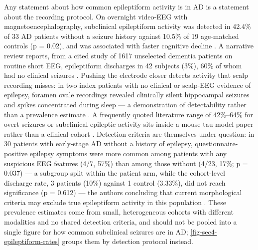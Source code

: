 \documentclass[11pt]{article}
\begin{document}
Any statement about how common epileptiform activity is in AD is a statement about the recording protocol. On overnight video-EEG with magnetoencephalography, subclinical epileptiform activity was detected in 42.4\% of 33 AD patients without a seizure history against 10.5\% of 19 age-matched controls (p = 0.02), and was associated with faster cognitive decline \citep{Vossel2016}. A narrative review reports, from a cited study of 1617 unselected dementia patients on routine short EEG, epileptiform discharges in 42 subjects (3\%), 60\% of whom had no clinical seizures \citep{Chen2024}. Pushing the electrode closer detects activity that scalp recording misses: in two index patients with no clinical or scalp-EEG evidence of epilepsy, foramen ovale recordings revealed clinically silent hippocampal seizures and spikes concentrated during sleep --- a demonstration of detectability rather than a prevalence estimate \citep{Lam2017}. A frequently quoted literature range of 42\%--64\% for overt seizures or subclinical epileptic activity sits inside a mouse tau-model paper rather than a clinical cohort \citep{Gao2026}. Detection criteria are themselves under question: in 30 patients with early-stage AD without a history of epilepsy, questionnaire-positive epilepsy symptoms were more common among patients with any suspicious EEG features (4/7, 57\%) than among those without (4/23, 17\%; p = 0.037) --- a subgroup split within the patient arm, while the cohort-level discharge rate, 3 patients (10\%) against 1 control (3.33\%), did not reach significance (p = 0.612) --- the authors concluding that current morphological criteria may exclude true epileptiform activity in this population \citep{BSzabo2026}. These prevalence estimates come from small, heterogeneous cohorts with different modalities and no shared detection criteria, and should not be pooled into a single figure for how common subclinical seizures are in AD; \ref{fig-sec4-epileptiform-rates} groups them by detection protocol instead.
\end{document}
